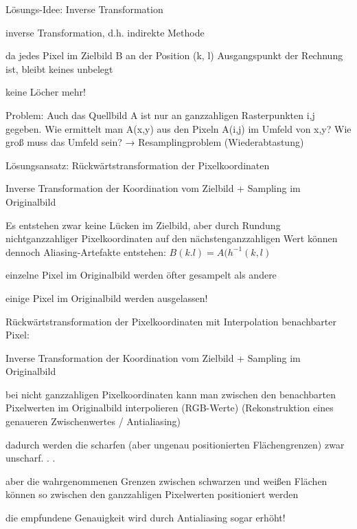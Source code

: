 \documentclass[landscape]{article}
\begin{document}
\begin{multicols}{3}
  Lösungs-Idee: Inverse Transformation
  \begin{itemize*}
    \item inverse Transformation, d.h. indirekte Methode
    \item da jedes Pixel im Zielbild B an der Position (k, l) Ausgangspunkt der Rechnung ist, bleibt keines unbelegt
    \item keine Löcher mehr!
    \item Problem: Auch das Quellbild A ist nur an ganzzahligen Rasterpunkten i,j gegeben. Wie ermittelt man A(x,y) aus den Pixeln A(i,j) im Umfeld von x,y? Wie groß muss das Umfeld sein? → Resamplingproblem (Wiederabtastung)
  \end{itemize*}
  
  Lösungsansatz: Rückwärtstransformation der Pixelkoordinaten
  \begin{itemize*}
    \item Inverse Transformation der Koordination vom Zielbild + Sampling im Originalbild
    \item Es entstehen zwar keine Lücken im Zielbild, aber durch Rundung nichtganzzahliger Pixelkoordinaten auf den nächstenganzzahligen Wert können dennoch Aliasing-Artefakte entstehen: $B(k.l)=A(h^{-1}(k,l)$
          \begin{itemize*}
            \item einzelne Pixel im Originalbild werden öfter gesampelt als andere
            \item einige Pixel im Originalbild werden ausgelassen!
          \end{itemize*}
  \end{itemize*}
  
  
  Rückwärtstransformation der Pixelkoordinaten mit Interpolation benachbarter Pixel:
  \begin{itemize*}
    \item Inverse Transformation der Koordination vom Zielbild + Sampling im Originalbild
    \item bei nicht ganzzahligen Pixelkoordinaten kann man zwischen den benachbarten Pixelwerten im Originalbild interpolieren (RGB-Werte) (Rekonstruktion eines genaueren Zwischenwertes / Antialiasing)
    \item dadurch werden die scharfen (aber ungenau positionierten Flächengrenzen) zwar unscharf. . .
    \item aber die wahrgenommenen Grenzen zwischen schwarzen und weißen Flächen können so zwischen den ganzzahligen Pixelwerten positioniert werden
    \item die empfundene Genauigkeit wird durch Antialiasing sogar erhöht!
  \end{itemize*}
  

\end{multicols}
\end{document}

